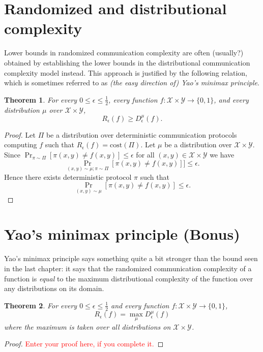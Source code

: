 \documentclass[11pt]{amsart}
\theoremstyle{plain}
\newtheorem{theorem}{Theorem}
\theoremstyle{definition}
\theoremstyle{plain}
\newcommand{\calX}{\mathcal{X}}
\newcommand{\calY}{\mathcal{Y}}
\newcommand{\cost}{\mathrm{cost}}
\newcommand{\replacethistext}[1]{\textcolor{red}{#1}}
\begin{document}
\newpage 
\section{Randomized and distributional complexity}

Lower bounds in randomized communication complexity are often (usually?) obtained by establishing the lower bounds in the distributional communication complexity model instead. This approach is justified by the following relation, which is sometimes referred to as \emph{(the easy direction of) Yao's minimax principle}.

\begin{theorem}
For every $0 \le \epsilon \le \frac12$, every function $f : \calX \times \calY \to \{0,1\}$, and every distribution $\mu$ over $\calX \times \calY$,
\[
R_\epsilon(f) \ge D_\epsilon^\mu(f).
\]
\end{theorem}

\begin{proof}
Let $\Pi$ be a distribution over deterministic communication protocols computing $f$ such that $R_\epsilon(f) = \cost(\Pi)$. Let $\mu$ be a distribution over $\calX\times\calY$. Since $\Pr_{\pi \sim \Pi}[\pi(x,y)\neq f(x,y)]\leq \epsilon$ for all $(x,y) \in \calX \times \calY$ we have
$$\Pr_{(x,y)\sim \mu ;\pi\sim \Pi}[\pi(x,y)\neq f(x,y)]] \leq \epsilon.$$
Hence there exists deterministic protocol $\pi$ such that 
$$\Pr_{(x,y)\sim \mu}[\pi(x,y) \neq f(x,y)] \leq \epsilon.$$
\end{proof}


\newpage 
\section{Yao's minimax principle (Bonus)}

Yao's minimax principle says something quite a bit stronger than the bound seen in the last chapter: it says that the randomized communication complexity of a function is \emph{equal} to the maximum distributional complexity of the function over any distributions on its domain.

\begin{theorem}
For every $0 \le \epsilon \le \frac12$ and every function $f : \calX \times \calY \to \{0,1\}$, 
\[
R_\epsilon(f) = \max_{\mu} D_\epsilon^\mu(f)
\]
where the maximum is taken over all distributions on $\calX \times \calY$.
\end{theorem}

\begin{proof}
\replacethistext{Enter your proof here, if you complete it.}
\end{proof}
\end{document}
